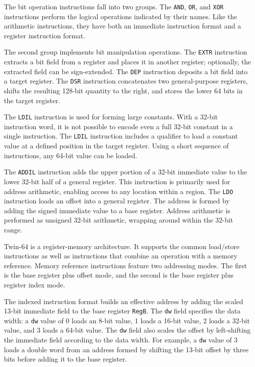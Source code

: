 
The bit operation instructions fall into two groups. The \texttt{AND}, \texttt{OR}, and \texttt{XOR} instructions perform the logical operations indicated by their names. Like the arithmetic instructions, they have both an immediate instruction format and a register instruction format.

The second group implements bit manipulation operations. The \texttt{EXTR} instruction extracts a bit field from a register and places it in another register; optionally, the extracted field can be sign-extended. The \texttt{DEP} instruction deposits a bit field into a target register. The \texttt{DSR} instruction concatenates two general-purpose registers, shifts the resulting 128-bit quantity to the right, and stores the lower 64 bits in the target register.


The \texttt{LDIL} instruction is used for forming large constants. With a 32-bit instruction word, it is not possible to encode even a full 32-bit constant in a single instruction. The \texttt{LDIL} instruction includes a qualifier to load a constant value at a defined position in the target register. Using a short sequence of instructions, any 64-bit value can be loaded.

The \texttt{ADDIL} instruction adds the upper portion of a 32-bit immediate value to the lower 32-bit half of a general register. This instruction is primarily used for address arithmetic, enabling access to any location within a region. The \texttt{LDO} instruction loads an offset into a general register. The address is formed by adding the signed immediate value to a base register. Address arithmetic is performed as unsigned 32-bit arithmetic, wrapping around within the 32-bit range.


Twin-64 is a register-memory architecture. It supports the common load/store instructions as well as instructions that combine an operation with a memory reference. Memory reference instructions feature two addressing modes. The first is the base register plus offset mode, and the second is the base register plus register index mode.  

The indexed instruction format builds an effective address by adding the scaled 13-bit immediate field to the base register \texttt{RegB}. The \texttt{dw} field specifies the data width: a \texttt{dw} value of 0 loads an 8-bit value, 1 loads a 16-bit value, 2 loads a 32-bit value, and 3 loads a 64-bit value. The \texttt{dw} field also scales the offset by left-shifting the immediate field according to the data width. For example, a \texttt{dw} value of 3 loads a double word from an address formed by shifting the 13-bit offset by three bits before adding it to the base register.  

